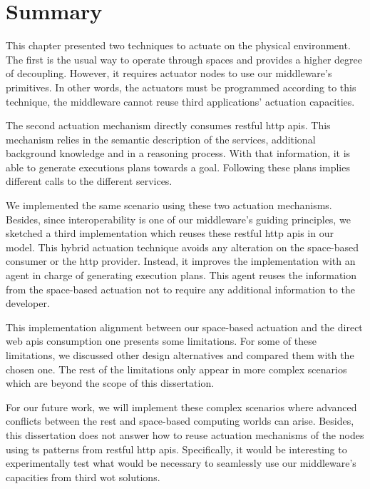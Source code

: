 \section{Summary}
\label{sec:actuation_summary}

This chapter presented two techniques to actuate on the physical environment.
The first is the usual way to operate through spaces and provides a higher degree of decoupling.
However, it requires actuator nodes to use our middleware's primitives. %
In other words, the actuators must be programmed according to this technique, the middleware cannot reuse third applications' actuation capacities.


The second actuation mechanism directly consumes \ac{rest}ful \acs{http} \acsp{api}.
This mechanism relies in the semantic description of the services, additional background knowledge and in a reasoning process. %
With that information, it is able to generate executions plans towards a goal.
Following these plans implies different calls to the different services.


We implemented the same scenario using these two actuation mechanisms.
Besides, since interoperability is one of our middleware's guiding principles, we sketched a third implementation which reuses these \ac{rest}ful \acs{http} \acsp{api} in our \Space{} model.
This hybrid actuation technique avoids any alteration on the space-based consumer or the \ac{http} provider.
Instead, it improves the \Space{} implementation with an agent in charge of generating execution plans.
This agent reuses the information from the space-based actuation not to require any additional information to the developer.


This implementation alignment between our space-based actuation and the direct web \acsp{api} consumption one presents some limitations.
For some of these limitations, we discussed other design alternatives and compared them with the chosen one.
The rest of the limitations only appear in more complex scenarios which are beyond the scope of this dissertation.


For our future work, we will implement these complex scenarios where advanced conflicts between the \ac{rest} and space-based computing worlds can arise.
Besides, this dissertation does not answer how to reuse actuation mechanisms of the nodes using \ac{ts} patterns from \ac{rest}ful \acs{http} \acsp{api}.
Specifically, it would be interesting to experimentally test what would be necessary to seamlessly use our middleware's capacities from  third \ac{wot} solutions.